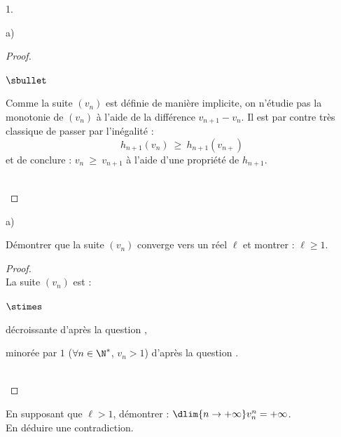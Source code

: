 \documentclass[11pt]{article}%
\begin{document}
\begin{noliste}{1.}
\begin{noliste}{a)}
\begin{proof}
\begin{remarkL}{1}
\begin{noliste}{$\sbullet$}
        \item Comme la suite $(v_n)$ est définie de manière implicite,
          on n'étudie pas la monotonie de $(v_n)$ à l'aide de la
          différence $v_{n+1} - v_n$. Il est par contre très classique
          de passer par l'inégalité : 
          \[
          h_{n+1}(v_n) \ \geq \ h_{n+1}(v_{n+})
          \]
          et de conclure : $v_n \ \geq \ v_{n+1}$ à l'aide d'une
          propriété de $h_{n+1}$.
        \end{noliste}
      \end{remarkL}~\\[-1.6cm]
    \end{proof}
  \end{noliste}
  

  \newpage


\item 
  \begin{noliste}{a)}
    \setlength{\itemsep}{2mm}
  \item Démontrer que la suite $(v_n)$ converge vers un réel $\ell$ et
    montrer : $\ell \geq 1$.

    \begin{proof}~\\%
      La suite $(v_n)$ est :
      \begin{noliste}{$\stimes$}
      \item décroissante d'après la question ,
      \item minorée par $1$ ($\forall n \in \N^*$, $v_n > 1$) d'après
        la question .        
      \end{noliste}
      ~\\[-1.2cm]
    \end{proof}
    
  \item En supposant que $\ell > 1$, démontrer : $\dlim{n \to +\infty}
    v_n^n = +\infty$.\\
    En déduire une contradiction.


\end{noliste}
\end{noliste}
\end{document}

